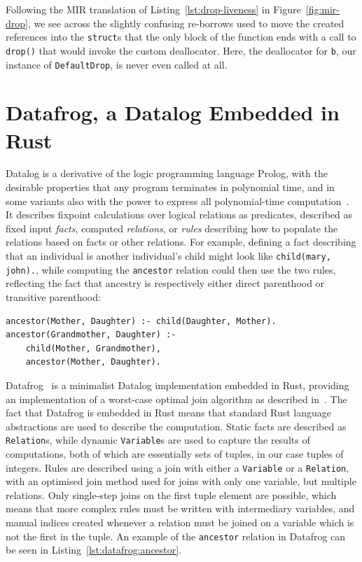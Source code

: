 \documentclass[11pt,a4paper,twoside,openany,draft]{report}
\newcommand{\InRust}[1]{\texttt{#1}}
\newcommand{\InDatalog}[1]{\texttt{#1}}
\begin{document}
Following the MIR translation of Listing~\ref{lst:drop-liveness} in
Figure~\ref{fig:mir-drop}, we see across the slightly confusing re-borrows used
to move the created references into the \InRust{struct}s that the only block of
the function ends with a call to \InRust{drop()} that would invoke the custom
deallocator. Here, the deallocator for \InRust{b}, our instance of
\InRust{DefaultDrop}, is never even called at all.

\section{Datafrog, a Datalog Embedded in Rust}
\label{sec:datalog}

Datalog is a derivative of the logic programming language Prolog, with the
desirable properties that any program terminates in polynomial time, and in some
variants also with the power to express all polynomial-time
computation~\cite{afrati_datalog_1995}. It describes fixpoint calculations over
logical relations as predicates, described as fixed input \emph{facts}, computed
\emph{relations}, or \emph{rules} describing how to populate the relations based
on facts or other relations. For example, defining a fact describing that an
individual is another individual's child might look like
\InDatalog{child(mary, john).}, while computing the \InDatalog{ancestor}
relation could then use the two rules, reflecting the fact that ancestry is
respectively either direct parenthood or transitive parenthood:
\begin{verbatim}
ancestor(Mother, Daughter) :- child(Daughter, Mother).
ancestor(Grandmother, Daughter) :- 
    child(Mother, Grandmother),
    ancestor(Mother, Daughter).
\end{verbatim}

Datafrog~\cite{datafrog} is a minimalist Datalog implementation embedded in
Rust, providing an implementation of a worst-case optimal join algorithm as
described in~\cite{ngo_worst-case_2012}. The fact that Datafrog is embedded in
Rust means that standard Rust language abstractions are used to describe the
computation. Static facts are described as \InRust{Relation}s, while dynamic
\InRust{Variable}s are used to capture the results of computations, both of
which are essentially sets of tuples, in our case tuples of integers. Rules are
described using a join with either a \InRust{Variable} or a \InRust{Relation},
with an optimised join method used for joins with only one variable, but
multiple relations. Only single-step joins on the first tuple element are
possible, which means that more complex rules must be written with intermediary
variables, and manual indices created whenever a relation must be joined on a
variable which is not the first in the tuple. An example of the
\InDatalog{ancestor} relation in Datafrog can be seen in
Listing~\ref{lst:datafrog:ancestor}.
\end{document}
